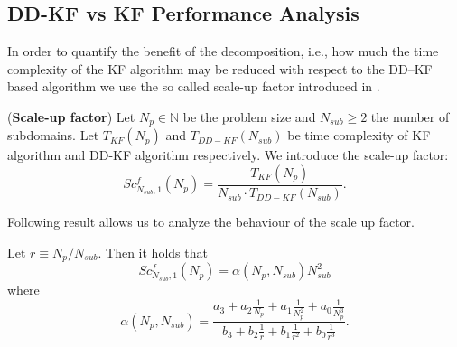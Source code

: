 \documentclass[smallcondensed]{svjour3}
\begin{document}
\subsection{DD-KF vs KF Performance Analysis}
 \noindent  In order to  quantify the benefit of the decomposition, i.e., how much  the time complexity of the KF algorithm  may be reduced  with respect to the DD--KF based algorithm we use the so called scale-up factor introduced in \cite{CAI}.\\
\begin{definition} (\textbf{Scale-up factor})
Let $N_p \in \mathbb{N}$ be the problem size and $N_{sub}\ge 2$ the number of subdomains. Let $T_{KF}(N_p)$ and  $T_{DD-KF}(N_{sub})$ be  time complexity of  KF algorithm   and DD-KF algorithm  respectively. We introduce the scale-up factor:
\begin{equation}\label{factor}
Sc^f_{N_{sub},1}(N_p)=\frac{T_{KF}(N_p)}{N_{sub}\cdot T_{DD-KF}(N_{sub})}.
\end{equation}
\end{definition}

 

\noindent Following result allows us to analyze the behaviour of the scale up factor.


\begin{proposition}

Let  $r \equiv N_p/N_{sub}$. Then it holds that
\begin{equation*}
Sc^f_{N_{sub},1}(N_p)=\alpha(N_p,N_{sub})N_{sub}^{2}
\end{equation*} 
where
\begin{equation}
\alpha(N_p,N_{sub})=\frac{a_{3}+a_{2}\frac{1}{N_p}+a_{1}\frac{1}{N_p^{2}}+a_{0}\frac{1}{N_p^{3}}}{b_{3}+b_{2}\frac{1}{r}+b_{1}\frac{1}{r^{2}}+b_{0}\frac{1}{r^{3}}}.
\end{equation}
\end{proposition}
\end{document}
